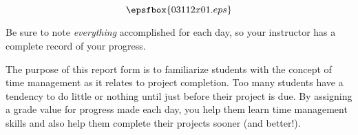 

$$\epsfbox{03112x01.eps}$$

\vfil \eject






Be sure to note {\it everything} accomplished for each day, so your instructor has a complete record of your progress.







The purpose of this report form is to familiarize students with the concept of time management as it relates to project completion.  Too many students have a tendency to do little or nothing until just before their project is due.  By assigning a grade value for progress made each day, you help them learn time management skills and also help them complete their projects sooner (and better!).




